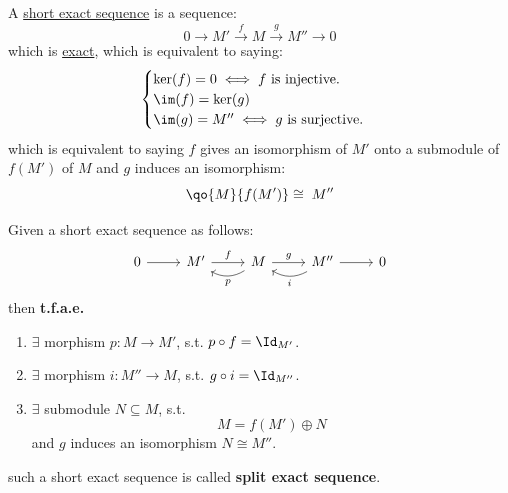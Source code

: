 \begin{definition}
	A \underline{short exact sequence} is a sequence:
	\[
		0 \rightarrow M' \xrightarrow{f} M \xrightarrow{g} M'' \rightarrow 0
	\]
	which is \underline{exact}, which is equivalent to saying:
	\[
		\begin{cases}
			\ker (f) = 0 \iff f \text{ is injective.} \\
			\im(f) = \ker(g)                          \\
			\im(g) = M'' \iff g \text{ is surjective.}
		\end{cases}
	\]
	which is equivalent to saying \( f \) gives an isomorphism of \( M' \) onto a submodule of \( f(M') \) of \( M \)
	and \( g \) induces an isomorphism:
	\[
		\qo{M}{f(M')} \cong \; M''
	\]
\end{definition}

\begin{exercise}
	Given a short exact sequence as follows:
	\[
		\begin{tikzcd}
			0 \arrow[r] & M' \arrow[r, "f"] & M \arrow[r, "g"] \arrow[l, "p", bend left] & M'' \arrow[r] \arrow[l, "i", bend left] & 0
		\end{tikzcd}
	\]
	then \textbf{t.f.a.e.}
	\begin{enumerate}
		\item \( \exists \) morphism \( p: M \to M' \), s.t. \( p\circ f = \Id_{M'} \).
		\item \( \exists \) morphism \( i: M'' \to M \), s.t. \( g\circ i = \Id_{M''} \).
		\item \( \exists \) submodule \( N \subseteq M \), s.t.
		      \[
			      M = f(M') \oplus N
		      \]
		      and \( g \) induces an isomorphism \( N \cong M'' \).
	\end{enumerate}
	such a short exact sequence is called \textbf{split exact sequence}.
\end{exercise}
